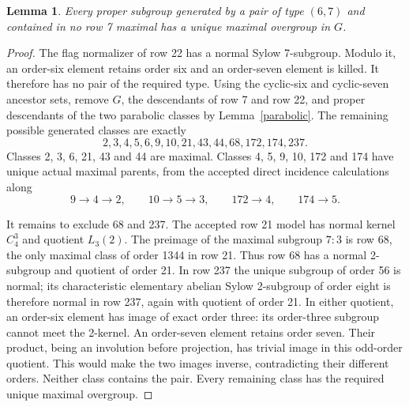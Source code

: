 \documentclass[11pt,a4paper]{article}
\newtheorem{lemma}{Lemma}\newtheorem{theorem}{Theorem}
\begin{document}
\begin{lemma}\label{outside}
Every proper subgroup generated by a pair of type $(6,7)$ and
contained in no row 7 maximal has a unique maximal overgroup in $G$.
\end{lemma}
\begin{proof}
The flag normalizer of row 22 has a normal Sylow 7-subgroup. Modulo
it, an order-six element retains order six and an order-seven
element is killed. It therefore has no pair of the required type.
Using the cyclic-six and cyclic-seven ancestor sets, remove $G$,
the descendants of row 7 and row 22, and proper descendants of the
two parabolic classes by Lemma~\ref{parabolic}. The remaining
possible generated classes are exactly
\[
                 2,3,4,5,6,9,10,21,43,44,68,172,174,237.
\]
Classes 2, 3, 6, 21, 43 and 44 are maximal. Classes 4, 5, 9, 10,
172 and 174 have unique actual maximal parents, from the accepted
direct incidence calculations along
\[
                 9\longrightarrow4\longrightarrow2,
 \qquad10\longrightarrow5\longrightarrow3,
 \qquad172\longrightarrow4,
 \qquad174\longrightarrow5.
\]

It remains to exclude 68 and 237. The accepted row 21 model has
normal kernel $C_4^3$ and quotient $L_3(2)$. The preimage of the
maximal subgroup $7:3$ is row 68, the only maximal class of order
1344 in row 21. Thus row 68 has a normal 2-subgroup and quotient
of order 21. In row 237 the unique subgroup of order 56 is normal; its
characteristic elementary abelian Sylow 2-subgroup of order eight
is therefore normal in row 237, again with quotient of order 21.
In either quotient, an order-six element has image of exact order
three: its order-three subgroup cannot meet the 2-kernel. An
order-seven element retains order seven. Their product, being an
involution before projection, has trivial image in this odd-order
quotient. This would make the two images inverse, contradicting
their different orders. Neither class contains the pair. Every
remaining class has the required unique maximal overgroup.
\end{proof}
\end{document}

